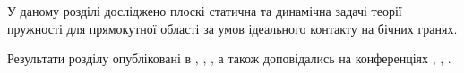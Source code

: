 У даному розділі досліджено плоскі статична та динамічна задачі теорії пружності для прямокутної області
за умов ідеального контакту на бічних гранях.



Результати розділу опубліковані в \cite{pozhylenkov_1}, \cite{pozhylenkov_2}, \cite{pozhylenkov_3}, \cite{pozhylenkov_5}
а також доповідались на конференціях \cite{conf_1}, \cite{conf_2}, \cite{conf_4}.